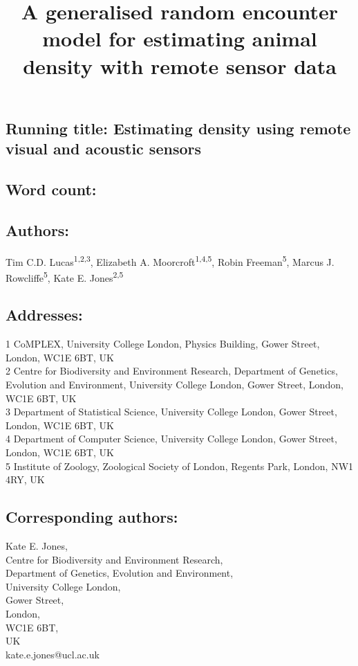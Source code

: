 \documentclass[a4paper,10pt,reqno,oneside]{amsart}
\begin{document}
\title[Estimating density using remote visual and acoustic sensors]{A generalised random encounter model for estimating animal density with remote sensor data}
\maketitle

\subsection*{ Running title: Estimating density using remote visual and acoustic sensors}

\subsection*{ Word count:}

\subsection*{ Authors:\\}
Tim C.D. Lucas\textsuperscript{1,2,3}, Elizabeth A. Moorcroft\textsuperscript{1,4,5}, Robin Freeman\textsuperscript{5}, Marcus J. Rowcliffe\textsuperscript{5}, Kate E. Jones\textsuperscript{2,5}


\subsection*{ Addresses:\\}
1 CoMPLEX, University College London, Physics Building, Gower Street, London, WC1E 6BT, UK\\ 
2 Centre for Biodiversity and Environment Research, Department of Genetics, Evolution and Environment, University College London, Gower Street, London, WC1E 6BT, UK\\ 
3 Department of Statistical Science, University College London, Gower Street, London, WC1E 6BT, UK\\ 
4 Department of Computer Science, University College London, Gower Street, London, WC1E 6BT, UK\\ 
5 Institute of Zoology, Zoological Society of London, Regents Park, London, NW1 4RY, UK


\subsection*{ Corresponding authors:\\}
Kate E. Jones,\\
Centre for Biodiversity and Environment Research,\\
Department of Genetics, Evolution and Environment,\\
University College London,\\
Gower Street,\\
London,\\
WC1E 6BT, \\
UK\\
kate.e.jones@ucl.ac.uk\\
\end{document}
